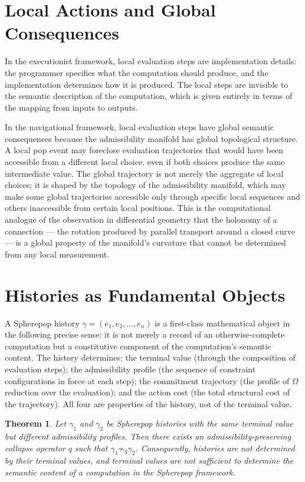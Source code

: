 \documentclass[12pt,openany]{book}
\theoremstyle{plain}
\newtheorem{theorem}{Theorem}[chapter]
\theoremstyle{definition}
\theoremstyle{remark}
\begin{document}
\section{Local Actions and Global Consequences}

In the executionist framework, local evaluation steps are implementation details: the programmer specifies what the computation should produce, and the implementation determines how it is produced. The local steps are invisible to the semantic description of the computation, which is given entirely in terms of the mapping from inputs to outputs.

In the navigational framework, local evaluation steps have global semantic consequences because the admissibility manifold has global topological structure. A local pop event may foreclose evaluation trajectories that would have been accessible from a different local choice, even if both choices produce the same intermediate value. The global trajectory is not merely the aggregate of local choices; it is shaped by the topology of the admissibility manifold, which may make some global trajectories accessible only through specific local sequences and others inaccessible from certain local positions. This is the computational analogue of the observation in differential geometry that the holonomy of a connection — the rotation produced by parallel transport around a closed curve — is a global property of the manifold's curvature that cannot be determined from any local measurement.

\section{Histories as Fundamental Objects}

A Spherepop history $\gamma = (e_1, e_2, \ldots, e_n)$ is a first-class mathematical object in the following precise sense: it is not merely a record of an otherwise-complete computation but a constitutive component of the computation's semantic content. The history determines: the terminal value (through the composition of evaluation steps); the admissibility profile (the sequence of constraint configurations in force at each step); the commitment trajectory (the profile of $\Omega$ reduction over the evaluation); and the action cost (the total structural cost of the trajectory). All four are properties of the history, not of the terminal value.

\begin{theorem}
Let $\gamma_1$ and $\gamma_2$ be Spherepop histories with the same terminal value but different admissibility profiles. Then there exists an admissibility-preserving collapse operator $q$ such that $\gamma_1 \not\sim_q \gamma_2$. Consequently, histories are not determined by their terminal values, and terminal values are not sufficient to determine the semantic content of a computation in the Spherepop framework.
\end{theorem}
\end{document}

